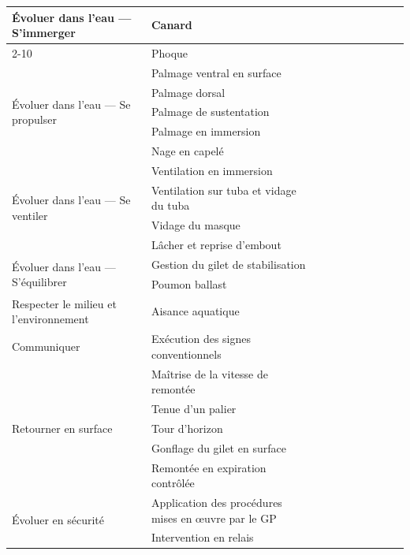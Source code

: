 \begin{center}
\begin{longtable}{|p{3.2cm}|p{5.3cm}|c|c|c|c|c|c|c|c|}
    \multirow{2}{=}{Évoluer dans l'eau --- S'immerger} & Canard & & & & & & & & \\ \cline{2-10}
    & Phoque & & & & & & & & \\
    \hline

    \multirow{5}{=}{Évoluer dans l'eau --- Se propulser} & Palmage ventral en surface & & & & & & & & \\ \cline{2-10}
    & Palmage dorsal & & & & & & & & \\ \cline{2-10}
    & Palmage de sustentation & & & & & & & & \\ \cline{2-10}
    & Palmage en immersion & & & & & & & & \\ \cline{2-10}
    & Nage en capelé & & & & & & & & \\
    \hline

    \multirow{4}{=}{Évoluer dans l'eau --- Se ventiler} & Ventilation en immersion & & & & & & & & \\ \cline{2-10}
    & Ventilation sur tuba et vidage du tuba & & & & & & & & \\ \cline{2-10}
    & Vidage du masque & & & & & & & & \\ \cline{2-10}
    & Lâcher et reprise d'embout & & & & & & & & \\
    \hline

    \multirow{2}{=}{Évoluer dans l'eau --- S'équilibrer} & Gestion du gilet de stabilisation & & & & & & & & \\ \cline{2-10}
    & Poumon ballast & & & & & & & & \\
    \hline

    Respecter le milieu et l'environnement & Aisance aquatique & & & & & & & & \\
    \hline

    Communiquer & Exécution des signes conventionnels & & & & & & & & \\
    \hline

    \multirow{5}{=}{Retourner en surface} & Maîtrise de la vitesse de remontée & & & & & & & & \\ \cline{2-10}
    & Tenue d'un palier & & & & & & & & \\ \cline{2-10}
    & Tour d'horizon & & & & & & & & \\ \cline{2-10}
    & Gonflage du gilet en surface & & & & & & & & \\ \cline{2-10}
    & Remontée en expiration contrôlée & & & & & & & & \\
    \hline

    \multirow{2}{=}{Évoluer en sécurité} & Application des procédures mises en œuvre par le GP & & & & & & & & \\ \cline{2-10}
    & Intervention en relais & & & & & & & & \\
    \hline

  \end{longtable}
\end{center}

